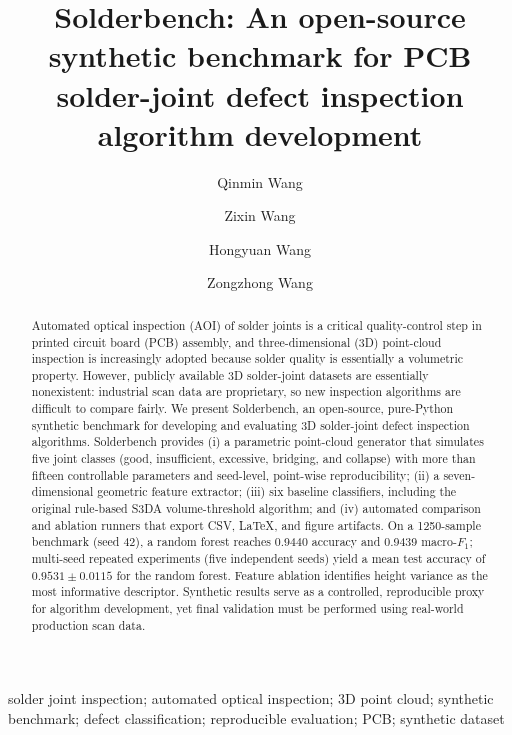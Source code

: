 \documentclass[3p]{elsarticle}
\begin{document}
\begin{frontmatter}
\title{Solderbench: An open-source synthetic benchmark for PCB solder-joint defect inspection algorithm development}
\author[1]{Qinmin Wang}
\author[2]{Zixin Wang}
\author[1]{Hongyuan Wang}
\author[3]{Zongzhong Wang}
\address[1]{School of Computer Science and Artificial Intelligence, Guangdong University of Science and Technology, Dongguan, China}
\address[2]{School of Electronic and Communication Engineering, Tianjin Normal University, Tianjin, China}
\address[3]{School of Electromechanical Engineering, Guangdong University of Technology, Guangzhou, China}
\begin{abstract}
Automated optical inspection (AOI) of solder joints is a critical quality-control step in printed circuit board (PCB) assembly, and three-dimensional (3D) point-cloud inspection is increasingly adopted because solder quality is essentially a volumetric property. However, publicly available 3D solder-joint datasets are essentially nonexistent: industrial scan data are proprietary, so new inspection algorithms are difficult to compare fairly. We present Solderbench, an open-source, pure-Python synthetic benchmark for developing and evaluating 3D solder-joint defect inspection algorithms. Solderbench provides (i) a parametric point-cloud generator that simulates five joint classes (good, insufficient, excessive, bridging, and collapse) with more than fifteen controllable parameters and \mbox{seed-level}, point-wise reproducibility; (ii) a seven-dimensional geometric feature extractor; (iii) six baseline classifiers, including the original rule-based S3DA volume-threshold algorithm; and (iv) automated comparison and ablation runners that export CSV, LaTeX, and figure artifacts. On a 1250-sample benchmark (seed 42), a random forest reaches 0.9440 accuracy and 0.9439 macro-$F_1$; multi-seed repeated experiments (five independent seeds) yield a mean test accuracy of $0.9531 \pm 0.0115$ for the random forest. Feature ablation identifies height variance as the most informative descriptor. Synthetic results serve as a controlled, reproducible proxy for algorithm development, yet final validation must be performed using real-world production scan data.
\end{abstract}
\begin{keyword}
solder joint inspection; automated optical inspection; 3D point cloud; synthetic benchmark; defect classification; reproducible evaluation; PCB; synthetic dataset
\end{keyword}
\end{frontmatter}
\end{document}
